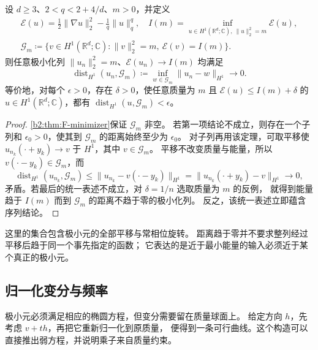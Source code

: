 \begin{corollary}[极小化列接近极小元集合]
\label{b2:cor:F-minimizer-set}
设 \(d\ge3\)、\(2<q<2+4/d\)、\(m>0\)，并定义
\[
 \begin{gathered}
 \mathcal E(u)=\frac12\|\nabla u\|_2^2-\frac1q\|u\|_q^q,
 \quad
 I(m)=\inf_{u\in H^1(\mathbb R^d;\mathbb C),\ \|u\|_2^2=m}\mathcal E(u),\\
 \mathcal G_m\coloneqq
 \{v\in H^1(\mathbb R^d;\mathbb C):\|v\|_2^2=m,\ \mathcal E(v)=I(m)\}.
 \end{gathered}
\]
则任意极小化列 \(\|u_n\|_2^2=m\)、\(\mathcal E(u_n)\to I(m)\) 均满足
\[
 \operatorname{dist}_{H^1}(u_n,\mathcal G_m)
 \coloneqq\inf_{w\in\mathcal G_m}\|u_n-w\|_{H^1}\longrightarrow0.
\]
等价地，对每个 \(\epsilon>0\)，存在 \(\delta>0\)，使任意质量为 \(m\) 且
\(\mathcal E(u)\le I(m)+\delta\) 的 \(u\in H^1(\mathbb R^d;\mathbb C)\)，都有
\(\operatorname{dist}_{H^1}(u,\mathcal G_m)<\epsilon\)。
\end{corollary}
\begin{proof}
\cref{b2:thm:F-minimizer}保证 \(\mathcal G_m\) 非空。
若第一项结论不成立，则存在一个子列和 \(\epsilon_0>0\)，使其到 \(\mathcal G_m\) 的距离始终至少为 \(\epsilon_0\)。
对子列再用该定理，可取平移使 \(u_{n_k}(\cdot+y_k)\to v\) 于 \(H^1\)，其中 \(v\in\mathcal G_m\)。
平移不改变质量与能量，所以 \(v(\cdot-y_k)\in\mathcal G_m\)，而
\[
 \operatorname{dist}_{H^1}(u_{n_k},\mathcal G_m)
 \le\|u_{n_k}-v(\cdot-y_k)\|_{H^1}
 =\|u_{n_k}(\cdot+y_k)-v\|_{H^1}\longrightarrow0,
\]
矛盾。若最后的统一表述不成立，对 \(\delta=1/n\) 选取质量为 \(m\) 的反例，
就得到能量趋于 \(I(m)\) 而到 \(\mathcal G_m\) 的距离不趋于零的极小化列。
反之，该统一表述立即蕴含序列结论。
\end{proof}

这里的集合包含极小元的全部平移与常相位旋转。
距离趋于零并不要求整列经过平移后趋于同一个事先指定的函数；
它表达的是近于最小能量的输入必须近于某个真正的极小元。

\subsection{归一化变分与频率}
\label{b2:subsec:F-constrained-equation}

极小元必须满足相应的椭圆方程，但变分需要留在质量球面上。
给定方向 \(h\)，先考虑 \(v+th\)，再把它重新归一化到原质量，
便得到一条可行曲线。这个构造可以直接推出弱方程，并说明乘子来自质量约束。

